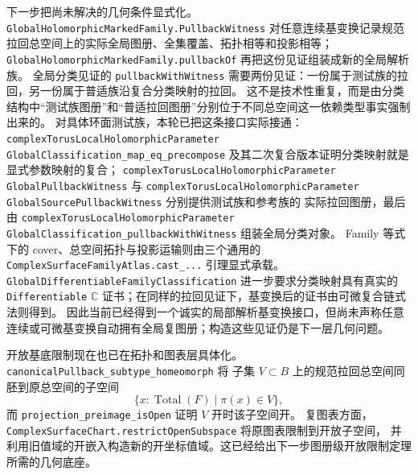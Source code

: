 \documentclass[UTF8,fontset=none,a4paper,11pt]{ctexart}
\begin{document}
\par
下一步把尚未解决的几何条件显式化。
\texttt{GlobalHolomorphic\allowbreak Marked\allowbreak Family\allowbreak.Pullback\allowbreak Witness} 对任意连续基变换记录规范拉回总空间上的实际全局图册、全集覆盖、拓扑相等和投影相等；
\texttt{GlobalHolomorphic\allowbreak Marked\allowbreak Family\allowbreak.pullbackOf} 再把这份见证组装成新的全局解析族。
全局分类见证的 \texttt{pullbackWithWitness} 需要两份见证：一份属于测试族的拉回，另一份属于普适族沿复合分类映射的拉回。
这不是技术性重复，而是由分类结构中“测试族图册”和“普适拉回图册”分别位于不同总空间这一依赖类型事实强制出来的。
对具体环面测试族，本轮已把这条接口实际接通：
\texttt{complexTorusLocal}\allowbreak\texttt{HolomorphicParameter}\allowbreak
\texttt{GlobalClassification}\allowbreak\texttt{\_map\_eq\_precompose}
及其二次复合版本证明分类映射就是显式参数映射的复合；
\texttt{complexTorusLocal}\allowbreak\texttt{HolomorphicParameter}\allowbreak
\texttt{GlobalPullbackWitness} 与
\texttt{complexTorusLocal}\allowbreak\texttt{HolomorphicParameter}\allowbreak
\texttt{GlobalSourcePullbackWitness} 分别提供测试族和参考族的
实际拉回图册，最后由
\texttt{complexTorusLocal}\allowbreak\texttt{HolomorphicParameter}\allowbreak
\texttt{GlobalClassification\_pullbackWithWitness} 组装全局分类对象。
Family 等式下的 cover、总空间拓扑与投影运输则由三个通用的
\texttt{ComplexSurfaceFamilyAtlas.cast\_...} 引理显式承载。
\texttt{GlobalDifferentiable\allowbreak Family\allowbreak Classification} 进一步要求分类映射具有真实的
\texttt{Differentiable\allowbreak} \(\mathbb C\) 证书；在同样的拉回见证下，基变换后的证书由可微复合链式法则得到。
因此当前已经得到一个诚实的局部解析基变换接口，但尚未声称任意连续或可微基变换自动拥有全局复图册；构造这些见证仍是下一层几何问题。
\par
开放基底限制现在也已在拓扑和图表层具体化。\texttt{canonicalPullback\_subtype\_homeomorph} 将
子集 \(V\subset B\) 上的规范拉回总空间同胚到原总空间的子空间
\[
  \{x:\operatorname{Total}(F)\mid \pi(x)\in V\},
\]
而 \texttt{projection\_preimage\_isOpen} 证明 \(V\) 开时该子空间开。
复图表方面，\texttt{ComplexSurfaceChart\allowbreak.restrictOpenSubspace} 将原图表限制到开放子空间，
并利用旧值域的开嵌入构造新的开坐标值域。这已经给出下一步图册级开放限制定理所需的几何底座。
\end{document}

